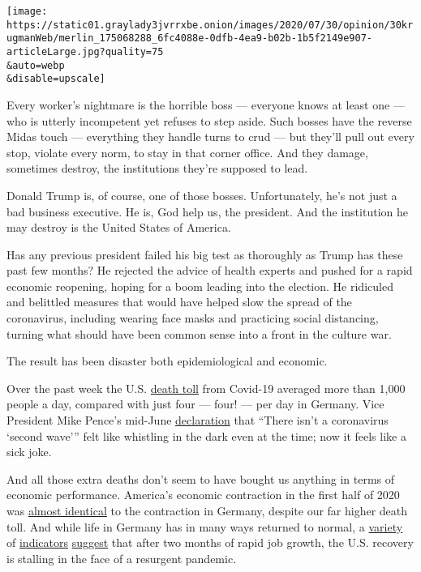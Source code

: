 \texttt{[image: https://static01.graylady3jvrrxbe.onion/images/2020/07/30/opinion/30krugmanWeb/merlin\_175068288\_6fc4088e-0dfb-4ea9-b02b-1b5f2149e907-articleLarge.jpg?quality=75\\\&auto=webp\\\&disable=upscale]}

Every worker's nightmare is the horrible boss --- everyone knows at
least one --- who is utterly incompetent yet refuses to step aside. Such
bosses have the reverse Midas touch --- everything they handle turns to
crud --- but they'll pull out every stop, violate every norm, to stay in
that corner office. And they damage, sometimes destroy, the institutions
they're supposed to lead.

Donald Trump is, of course, one of those bosses. Unfortunately, he's not
just a bad business executive. He is, God help us, the president. And
the institution he may destroy is the United States of America.

Has any previous president failed his big test as thoroughly as Trump
has these past few months? He rejected the advice of health experts and
pushed for a rapid economic reopening, hoping for a boom leading into
the election. He ridiculed and belittled measures that would have helped
slow the spread of the coronavirus, including wearing face masks and
practicing social distancing, turning what should have been common sense
into a front in the culture war.

The result has been disaster both epidemiological and economic.

Over the past week the U.S.
\href{https://ourworldindata.org/coronavirus-data-explorer?zoomToSelection=true\&deathsMetric=true\&interval=smoothed\&smoothing=7\&country=USA~DEU\&pickerMetric=location\&pickerSort=asc}{death
toll} from Covid-19 averaged more than 1,000 people a day, compared with
just four --- four! --- per day in Germany. Vice President Mike Pence's
mid-June
\href{https://www.wsj.com/articles/there-isnt-a-coronavirus-second-wave-11592327890}{declaration}
that ``There isn't a coronavirus `second wave''' felt like whistling in
the dark even at the time; now it feels like a sick joke.

And all those extra deaths don't seem to have bought us anything in
terms of economic performance. America's economic contraction in the
first half of 2020 was
\href{https://www.wsj.com/articles/germanys-economy-suffers-biggest-contraction-on-record-but-green-shoots-emerge-11596101866}{almost
identical} to the contraction in Germany, despite our far higher death
toll. And while life in Germany has in many ways returned to normal, a
\href{https://twitter.com/ernietedeschi/status/1286740199796596743}{variety}
of
\href{https://twitter.com/ernietedeschi/status/1286741059435995136}{indicators}
\href{https://twitter.com/dandolfa/status/1287907164955303936}{suggest}
that after two months of rapid job growth, the U.S. recovery is stalling
in the face of a resurgent pandemic.

